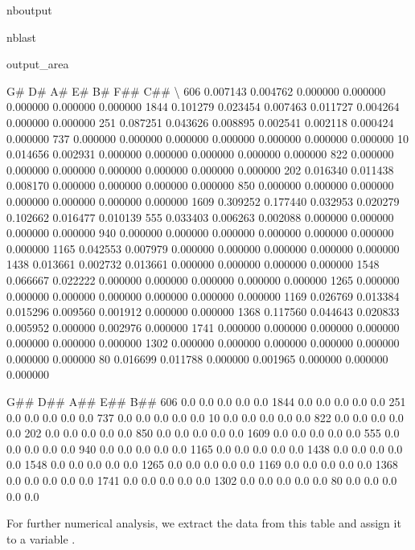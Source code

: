 \documentclass[letterpaper,10pt,english]{sphinxmanual}
\begin{document}
\begin{sphinxuseclass}{nboutput}
\begin{sphinxuseclass}{nblast}
{\begin{sphinxuseclass}{output_area}
\begin{sphinxuseclass}{}
\begin{sphinxVerbatim}[commandchars=\\\{\}]
            G\#        D\#        A\#        E\#        B\#       F\#\#       C\#\#  \textbackslash{}
606   0.007143  0.004762  0.000000  0.000000  0.000000  0.000000  0.000000
1844  0.101279  0.023454  0.007463  0.011727  0.004264  0.000000  0.000000
251   0.087251  0.043626  0.008895  0.002541  0.002118  0.000424  0.000000
737   0.000000  0.000000  0.000000  0.000000  0.000000  0.000000  0.000000
10    0.014656  0.002931  0.000000  0.000000  0.000000  0.000000  0.000000
822   0.000000  0.000000  0.000000  0.000000  0.000000  0.000000  0.000000
202   0.016340  0.011438  0.008170  0.000000  0.000000  0.000000  0.000000
850   0.000000  0.000000  0.000000  0.000000  0.000000  0.000000  0.000000
1609  0.309252  0.177440  0.032953  0.020279  0.102662  0.016477  0.010139
555   0.033403  0.006263  0.002088  0.000000  0.000000  0.000000  0.000000
940   0.000000  0.000000  0.000000  0.000000  0.000000  0.000000  0.000000
1165  0.042553  0.007979  0.000000  0.000000  0.000000  0.000000  0.000000
1438  0.013661  0.002732  0.013661  0.000000  0.000000  0.000000  0.000000
1548  0.066667  0.022222  0.000000  0.000000  0.000000  0.000000  0.000000
1265  0.000000  0.000000  0.000000  0.000000  0.000000  0.000000  0.000000
1169  0.026769  0.013384  0.015296  0.009560  0.001912  0.000000  0.000000
1368  0.117560  0.044643  0.020833  0.005952  0.000000  0.002976  0.000000
1741  0.000000  0.000000  0.000000  0.000000  0.000000  0.000000  0.000000
1302  0.000000  0.000000  0.000000  0.000000  0.000000  0.000000  0.000000
80    0.016699  0.011788  0.000000  0.001965  0.000000  0.000000  0.000000

      G\#\#  D\#\#  A\#\#  E\#\#  B\#\#
606   0.0  0.0  0.0  0.0  0.0
1844  0.0  0.0  0.0  0.0  0.0
251   0.0  0.0  0.0  0.0  0.0
737   0.0  0.0  0.0  0.0  0.0
10    0.0  0.0  0.0  0.0  0.0
822   0.0  0.0  0.0  0.0  0.0
202   0.0  0.0  0.0  0.0  0.0
850   0.0  0.0  0.0  0.0  0.0
1609  0.0  0.0  0.0  0.0  0.0
555   0.0  0.0  0.0  0.0  0.0
940   0.0  0.0  0.0  0.0  0.0
1165  0.0  0.0  0.0  0.0  0.0
1438  0.0  0.0  0.0  0.0  0.0
1548  0.0  0.0  0.0  0.0  0.0
1265  0.0  0.0  0.0  0.0  0.0
1169  0.0  0.0  0.0  0.0  0.0
1368  0.0  0.0  0.0  0.0  0.0
1741  0.0  0.0  0.0  0.0  0.0
1302  0.0  0.0  0.0  0.0  0.0
80    0.0  0.0  0.0  0.0  0.0
\end{sphinxVerbatim}



\end{sphinxuseclass}
\end{sphinxuseclass}
}

\end{sphinxuseclass}
\end{sphinxuseclass}
\sphinxAtStartPar
For further numerical analysis, we extract the data from this table and assign it to a variable .
\end{document}
